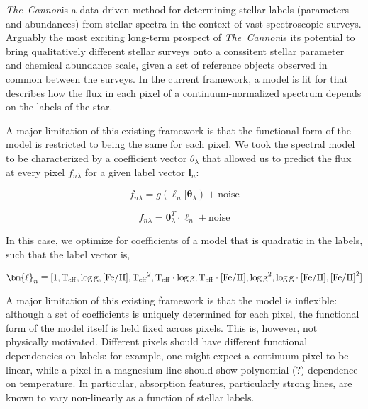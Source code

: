 \documentclass[12pt, preprint]{aastex}
\newcommand{\tc}{\textsl{The~Cannon}}
\newcommand{\set}[1]{\bm{#1}}
\newcommand{\starlabel}{\ell}
\newcommand{\starlabelvec}{\set{\starlabel}}
\newcommand{\teff}{\mbox{$\rm T_{eff}$}}
\newcommand{\feh}{\mbox{$\rm [Fe/H]$}}
\newcommand{\logg}{\mbox{$\rm \log g$}}
\begin{document}
\tc is a data-driven method for determining stellar labels (parameters and 
abundances) from stellar
spectra in the context of vast spectroscopic surveys. Arguably the most
exciting long-term prospect of \tc is its potential to bring qualitatively
different stellar surveys onto a conssitent stellar parameter and chemical
abundance scale, given a set of reference objects observed in common between
the surveys. In the current framework, a model is fit for that describes
how the flux in each pixel of a continuum-normalized spectrum depends
on the labels of the star.

A major limitation of this existing framework is that the functional form of 
the model is restricted to being the same for each pixel. We took the 
spectral model to be characterized by a coefficient vector $\theta_\lambda$ 
that allowed us to predict the flux at every pixel $f_{n \lambda}$ for a 
given label vector $\textbf{l}_n$:

\begin{equation}
  f_{n\lambda} = g(\starlabelvec_n | \set{\theta}_\lambda) + \mbox{noise} 
\end{equation}

\begin{equation}
  f_{n\lambda} = \set{\theta}_\lambda^T \cdot \starlabelvec_n + \mbox{noise}  
\end{equation}

In this case, we optimize for coefficients of a model that is quadratic in the
labels, such that the label vector is,

\begin{equation}
  \starlabelvec_n \equiv 
  [1, \teff, \logg, \feh, \teff^2, \teff\cdot\logg, \teff\cdot\feh, \logg^2, \logg\cdot\feh, \feh^2]
\end{equation}

A major limitation of this existing framework is that the model is inflexible:
although a set of coefficients is uniquely determined for each pixel, 
the functional form of the model itself is held fixed across pixels. 
This is, however, not physically motivated.  Different pixels should have 
different functional dependencies on labels: for example, one might expect a 
continuum pixel to be linear, while a pixel in a magnesium line should show 
polynomial (?) dependence on temperature. In particular, absorption features,
particularly strong lines, are known to vary non-linearly as a function of 
stellar labels. 

\end{document}
